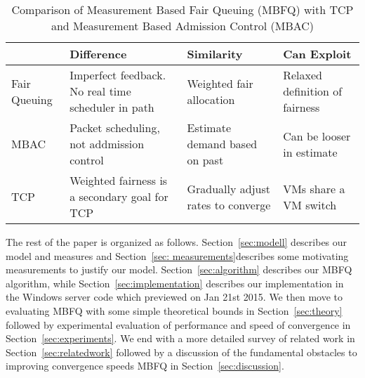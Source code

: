 \begin{table*}[h]
{\footnotesize
\begin{tabular}{l|l|l|l} \\
& Difference & Similarity & Can Exploit \\ \hline
Fair Queuing & Imperfect feedback. No real time scheduler in path & Weighted fair allocation & Relaxed definition of fairness \\ \hline
MBAC & Packet scheduling, not addmission control & Estimate demand based on past & Can be looser in estimate \\ \hline
TCP & Weighted fairness is a secondary goal for TCP & Gradually adjust rates to converge & VMs share a VM switch
\end{tabular}
}
\caption{Comparison of Measurement Based Fair Queuing (MBFQ) with TCP and Measurement Based Admission Control (MBAC) }
\label{microcosm}
\vspace{-3mm}
\end{table*}

The rest of the paper is organized as follows.  Section~\ref{sec:modell}
describes our model and measures and Section~\ref{sec: measurements}describes
some motivating measurements to justify our model.  Section~\ref{sec:algorithm}
describes our MBFQ algorithm, while Section~\ref{sec:implementation} describes
our implementation in the Windows server code which previewed on Jan 21st 2015.
We then move to evaluating MBFQ with some simple theoretical bounds in
Section~\ref{sec:theory} followed by experimental evaluation of performance and
speed of convergence in Section~\ref{sec:experiments}.  We end with a more
detailed survey of related work in Section~\ref{sec:relatedwork} followed by a
discussion of the fundamental obstacles to improving convergence speeds MBFQ in
Section~\ref{sec:discussion}.

